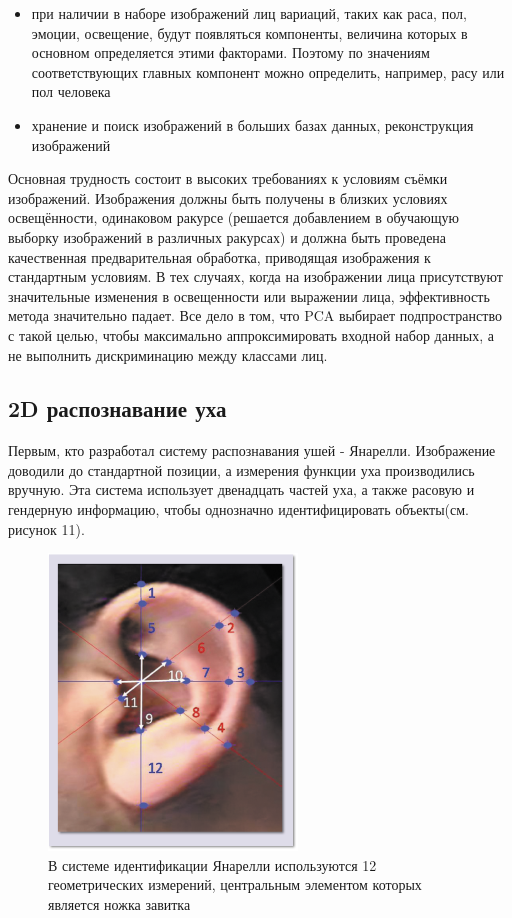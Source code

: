 \documentclass[12pt,a4paper]{article}					%
\begin{document}
\begin{itemize}
\item при наличии в наборе изображений лиц вариаций, таких как раса, пол, эмоции, освещение, будут появляться компоненты, величина которых в основном определяется этими факторами. Поэтому по значениям соответствующих главных компонент можно определить, например, расу или пол человека
\item хранение и поиск изображений в больших базах данных, реконструкция изображений
\end{itemize}
Основная трудность состоит в высоких требованиях к условиям съёмки изображений. 
Изображения должны быть получены в близких условиях освещённости, одинаковом ракурсе (решается добавлением в обучающую выборку изображений в различных ракурсах) и должна быть проведена качественная предварительная обработка, приводящая изображения к стандартным условиям.
В тех случаях, когда на изображении лица присутствуют значительные изменения в освещенности или выражении лица, эффективность метода значительно падает. 
Все дело в том, что PCA выбирает подпространство с такой целью, чтобы максимально аппроксимировать входной набор данных, а не выполнить дискриминацию между классами лиц. 




\subsection{2D распознавание уха}

Первым, кто разработал систему распознавания ушей - Янарелли. 
Изображение доводили до стандартной позиции, а измерения функции уха производились вручную.
Эта система использует двенадцать частей уха, а также расовую и гендерную информацию, чтобы однозначно идентифицировать объекты(см. рисунок 11).

\begin{figure}[h!]
\centering
\includegraphics[scale=0.70]{res/twelve_parts}
\caption{В системе идентификации Янарелли используются 12 геометрических измерений, центральным элементом которых является ножка завитка}
\end{figure}
\end{document}
